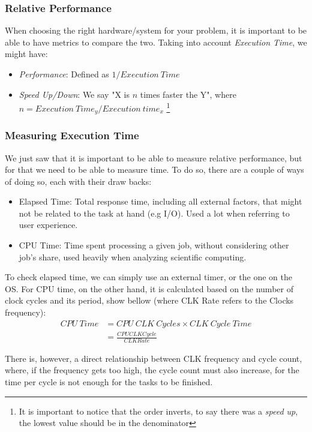 \documentclass{article}
\begin{document}
\subsubsection*{Relative Performance}
When choosing the right hardware/system for your problem, it is important to be able to have metrics to compare the two. Taking into account \emph{Execution Time}, we might have:
\begin{itemize}
    \item \emph{Performance}: Defined as $1/Execution \ Time$
    \item \emph{Speed Up/Down}: We say "X is $n$ times faster the Y", where $n = Execution \ Time_y / Execution \ time_x$ \footnote{It is important to notice that the order inverts, to say there was a \emph{speed up}, the lowest value should be in the denominator}
\end{itemize}

\subsubsection*{Measuring Execution Time}
We just saw that it is important to be able to measure relative performance, but for that we need to be able to measure time. To do so, there are a couple of ways of doing so, each with their draw backs:
\begin{itemize}
    \item Elapsed Time: Total response time, including all external factors, that might not be related to the task at hand (e.g I/O). Used a lot when referring to user experience.
    \item CPU Time: Time spent processing a given job, without considering other job's share, used heavily when analyzing scientific computing.
\end{itemize}

To check elapsed time, we can simply use an external timer, or the one on the OS. For CPU time, on the other hand, it is calculated based on the number of clock cycles and its period, show bellow (where CLK Rate refers to the Clocks frequency):
\begin{align}
    CPU \ Time &= CPU \ CLK\ Cycles \times CLK \ Cycle \ Time \\
               &= \frac{CPU CLK Cycle}{CLK Rate}
\end{align}

There is, however, a direct relationship between CLK frequency and cycle count, where, if the frequency gets too high, the cycle count must also increase, for the time per cycle is not enough for the tasks to be finished.
\end{document}
